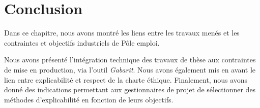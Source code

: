 %
%


\section{Conclusion}
Dans ce chapitre, nous avons montré les liens entre les travaux menés et les contraintes et objectifs industriels de Pôle emploi.

Nous avons présenté l'intégration technique des travaux de thèse aux contraintes de mise en production, via l'outil \textit{Gabarit}. Nous avons également mis en avant le lien entre explicabilité et respect de la charte éthique. Finalement, nous avons donné des indications permettant aux gestionnaires de projet de sélectionner des méthodes d'explicabilité en fonction de leurs objectifs.


